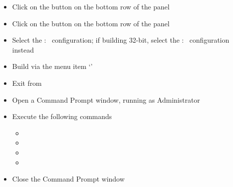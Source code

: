 \begin{itemize}
\item\exSp{}Click on the  button on the bottom row of the
 panel
\item\exSp{}Click on the  button on the bottom row of the
 panel
\item\exSp{}Select the  :\  configuration; if building 32-bit,
select the  :\  configuration instead
\item\exSp{}Build via the menu item `'
\item\exSp{}Exit from 
\item\exSp{}Open a Command Prompt window, running as Administrator
\item\exSp{}Execute the following commands
\begin{itemize}
\item {}
\item\exSp{}
\item\exSp{}
\item\exSp{}
\end{itemize}
\item\exSp{}Close the Command Prompt window
\end{itemize}
\tertiaryEnd
{}
